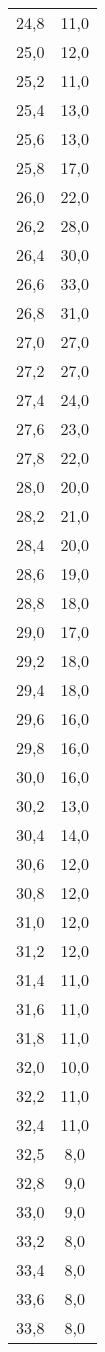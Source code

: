 \begin{longtable}{ S S }
    24,8 & 11,0 \\
    25,0 & 12,0 \\
    25,2 & 11,0 \\
    25,4 & 13,0 \\
    25,6 & 13,0 \\
    25,8 & 17,0 \\
    26,0 & 22,0 \\
    26,2 & 28,0 \\
    26,4 & 30,0 \\
    26,6 & 33,0 \\
    26,8 & 31,0 \\
    27,0 & 27,0 \\
    27,2 & 27,0 \\
    27,4 & 24,0 \\
    27,6 & 23,0 \\
    27,8 & 22,0 \\
    28,0 & 20,0 \\
    28,2 & 21,0 \\
    28,4 & 20,0 \\
    28,6 & 19,0 \\
    28,8 & 18,0 \\
    29,0 & 17,0 \\
    29,2 & 18,0 \\
    29,4 & 18,0 \\
    29,6 & 16,0 \\
    29,8 & 16,0 \\
    30,0 & 16,0 \\
    30,2 & 13,0 \\
    30,4 & 14,0 \\
    30,6 & 12,0 \\
    30,8 & 12,0 \\
    31,0 & 12,0 \\
    31,2 & 12,0 \\
    31,4 & 11,0 \\
    31,6 & 11,0 \\
    31,8 & 11,0 \\
    32,0 & 10,0 \\
    32,2 & 11,0 \\
    32,4 & 11,0 \\
    32,5 & 8,0 \\
    32,8 & 9,0 \\
    33,0 & 9,0 \\
    33,2 & 8,0 \\
    33,4 & 8,0 \\
    33,6 & 8,0 \\
    33,8 & 8,0 \\
\end{longtable}

